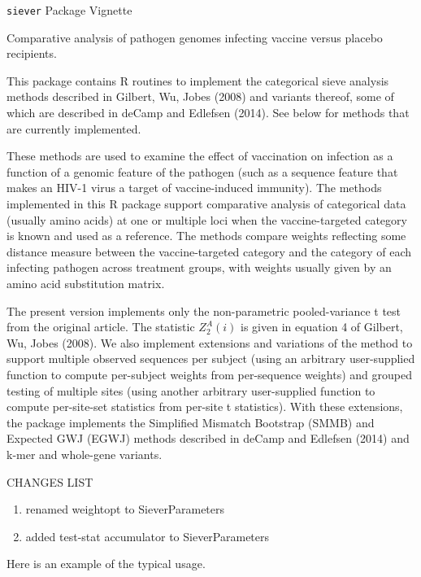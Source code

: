 \documentclass{article}
\begin{document}

\begin{center}
\Large
{\tt siever} Package Vignette
\normalsize
\end{center}

\noindent Comparative analysis of pathogen genomes infecting vaccine versus placebo recipients.

This package contains R routines to implement the categorical sieve
analysis methods described in Gilbert, Wu, Jobes (2008) and variants
thereof, some of which are described in deCamp and Edlefsen (2014). See below for methods that are currently implemented.

These methods are used to examine the effect of vaccination on
infection as a function of a genomic feature of the pathogen (such as
a sequence feature that makes an HIV-1 virus a target of
vaccine-induced immunity).  The methods implemented in this R package
support comparative analysis of categorical data (usually amino acids)
at one or multiple loci when the vaccine-targeted category is known
and used as a reference.  The methods compare weights reflecting some
distance measure between the vaccine-targeted category and the
category of each infecting pathogen across treatment groups, with
weights usually given by an amino acid substitution matrix.

The present version implements only the non-parametric pooled-variance
t test from the original article.  The statistic $Z_2^A(i)$ is given in equation 4 of
Gilbert, Wu, Jobes (2008).  We also implement extensions and variations of the method
to support multiple observed sequences per subject (using an arbitrary
user-supplied function to compute per-subject weights from
per-sequence weights) and grouped testing of multiple sites (using
another arbitrary user-supplied function to compute per-site-set
statistics from per-site t statistics).  With these extensions, the
package implements the Simplified Mismatch Bootstrap (SMMB) and
Expected GWJ (EGWJ) methods described in deCamp and Edlefsen (2014)
and k-mer and whole-gene variants.

CHANGES LIST
\begin{enumerate}
  \item{renamed weightopt to SieverParameters}
  \item{added test-stat accumulator to SieverParameters}
    
\end{enumerate}

Here is an example of the typical usage.
\end{document}
